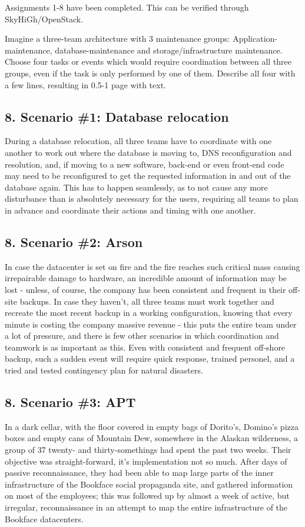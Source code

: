 Assignments 1-8 have been completed. This can be verified through SkyHiGh/OpenStack.

Imagine a three-team architecture with 3 maintenance groups: Application-maintenance, database-maintenance and storage/infrastructure maintenance. Choose four tasks or events which would require coordination between all three groups, even if the task is only performed by one of them. Describe all four with a few lines, resulting in 0.5-1 page with text.

\subsection{8. Scenario \#1: Database relocation}
During a database relocation, all three teams have to coordinate with one another to work out where the database is moving to, DNS reconfiguration and resolution, and, if moving to a new software, back-end or even front-end code may need to be reconfigured to get the requested information in and out of the database again. This has to happen seamlessly, as to not cause any more disturbance than is absolutely necessary for the users, requiring all teams to plan in advance and coordinate their actions and timing with one another.

\subsection{8. Scenario \#2: Arson}
In case the datacenter is set on fire and the fire reaches such critical mass causing irrepairable damage to hardware, an incredible amount of information may be lost - unless, of course, the company has been consistent and frequent in their off-site backups. In case they haven't, all three teams must work together and recreate the most recent backup in a working configuration, knowing that every minute is costing the company massive revenue - this puts the entire team under a lot of pressure, and there is few other scenarios in which coordination and teamwork is as important as this. Even with consistent and frequent off-shore backup, such a sudden event will require quick response, trained personel, and a tried and tested contingency plan for natural disasters.

\subsection{8. Scenario \#3: APT}
In a dark cellar, with the floor covered in empty bags of Dorito's, Domino's pizza boxes and empty cans of Mountain Dew, somewhere in the Alaskan wilderness, a group of 37 twenty- and thirty-somethings had spent the past two weeks. Their objective was straight-forward, it's implementation not so much. After days of passive reconnaissance, they had been able to map large parts of the inner infrastructure of the Bookface social propaganda site, and gathered information on most of the employees; this was followed up by almost a week of active, but irregular, reconnaissance in an attempt to map the entire infrastructure of the Bookface datacenters. 

